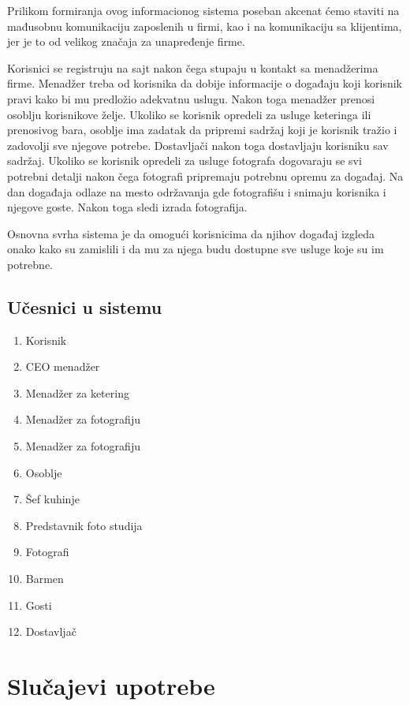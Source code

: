 \documentclass[a4paper]{article}
\begin{document}
Prilikom formiranja ovog informacionog sistema poseban akcenat ćemo staviti na mađusobnu komunikaciju zaposlenih u firmi, kao i na komunikaciju sa klijentima, jer je to od velikog značaja za unapređenje firme.
    
Korisnici se registruju na sajt nakon čega stupaju u kontakt sa menadžerima firme. Menadžer treba od korisnika da dobije informacije o događaju koji korisnik pravi kako bi mu predložio adekvatnu uslugu. Nakon toga menadžer prenosi osoblju korisnikove želje. 
Ukoliko se korisnik opredeli za usluge keteringa ili prenosivog bara, osoblje ima zadatak da pripremi sadržaj koji je korisnik tražio i zadovolji sve njegove potrebe. Dostavljači nakon toga dostavljaju korisniku sav sadržaj.
Ukoliko se korisnik opredeli za usluge fotografa dogovaraju se svi potrebni detalji nakon čega fotografi pripremaju potrebnu opremu za događaj. Na dan događaja odlaze na mesto održavanja gde fotografišu i snimaju korisnika i njegove goste. Nakon toga sledi izrada fotografija. 
    
Osnovna svrha sistema je da omogući korisnicima da njihov događaj izgleda onako kako su zamislili i da mu za njega budu dostupne sve usluge koje su im potrebne. 
    
    \subsection{Učesnici u sistemu}
    
    \begin{enumerate}
        \item Korisnik
        \item CEO menadžer
        \item Menadžer za ketering
        \item Menadžer za fotografiju
        \item Menadžer za fotografiju
        \item Osoblje
        \item Šef kuhinje
        \item Predstavnik foto studija
        \item Fotografi
        \item Barmen
        \item Gosti
        \item Dostavljač
    \end{enumerate}
    
    
\section{Slučajevi upotrebe}
\end{document}
